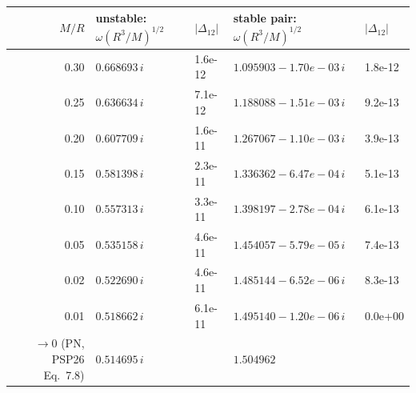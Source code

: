 \begin{tabular}{rllll}\toprule
$M/R$ & unstable: $\omega(R^3/M)^{1/2}$ & $|\Delta_{12}|$ & stable pair: $\omega(R^3/M)^{1/2}$ & $|\Delta_{12}|$\\\midrule
0.30 & $0.668693\,i$ & 1.6e-12 & $1.095903-1.70e-03\,i$ & 1.8e-12 \\
0.25 & $0.636634\,i$ & 7.1e-12 & $1.188088-1.51e-03\,i$ & 9.2e-13 \\
0.20 & $0.607709\,i$ & 1.6e-11 & $1.267067-1.10e-03\,i$ & 3.9e-13 \\
0.15 & $0.581398\,i$ & 2.3e-11 & $1.336362-6.47e-04\,i$ & 5.1e-13 \\
0.10 & $0.557313\,i$ & 3.3e-11 & $1.398197-2.78e-04\,i$ & 6.1e-13 \\
0.05 & $0.535158\,i$ & 4.6e-11 & $1.454057-5.79e-05\,i$ & 7.4e-13 \\
0.02 & $0.522690\,i$ & 4.6e-11 & $1.485144-6.52e-06\,i$ & 8.3e-13 \\
0.01 & $0.518662\,i$ & 6.1e-11 & $1.495140-1.20e-06\,i$ & 0.0e+00 \\
$\to0$ (PN, PSP26 Eq.~7.8) & $0.514695\,i$ & & $1.504962$ & \\
\bottomrule\end{tabular}
